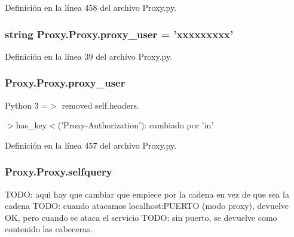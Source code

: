Definición en la línea 458 del archivo Proxy.\-py.

\hypertarget{class_proxy_1_1_proxy_a21e5768434deac18cef85f8a8a9870ac}{
\subsubsection[{proxy\-\_\-user}]{\setlength{\rightskip}{0pt plus 5cm}string Proxy.\-Proxy.\-proxy\-\_\-user = 'xxxxxxxxx'\hspace{0.3cm}{\ttfamily [static]}}}\label{class_proxy_1_1_proxy_a21e5768434deac18cef85f8a8a9870ac}


Definición en la línea 39 del archivo Proxy.\-py.

\hypertarget{class_proxy_1_1_proxy_a6e94f2561fe165ea83cfd7871f78d847}{
\subsubsection[{proxy\-\_\-user}]{\setlength{\rightskip}{0pt plus 5cm}Proxy.\-Proxy.\-proxy\-\_\-user}}\label{class_proxy_1_1_proxy_a6e94f2561fe165ea83cfd7871f78d847}


Python 3 =$>$ removed self.\-headers. 

$>$has\-\_\-key$<$('Proxy-\/\-Authorization')\-: cambiado por 'in' 

Definición en la línea 457 del archivo Proxy.\-py.

\hypertarget{class_proxy_1_1_proxy_a69004ca892885efbc366741241b569a4}{
\subsubsection[{selfquery}]{\setlength{\rightskip}{0pt plus 5cm}Proxy.\-Proxy.\-selfquery}}\label{class_proxy_1_1_proxy_a69004ca892885efbc366741241b569a4}


T\-O\-D\-O\-: aqui hay que cambiar que empiece por la cadena en vez de que sea la cadena T\-O\-D\-O\-: cuando atacamos localhost\-:P\-U\-E\-R\-T\-O (modo proxy), devuelve O\-K, pero cuando se ataca el servicio T\-O\-D\-O\-: sin puerto, se devuelve como contenido las cabeceras. 



